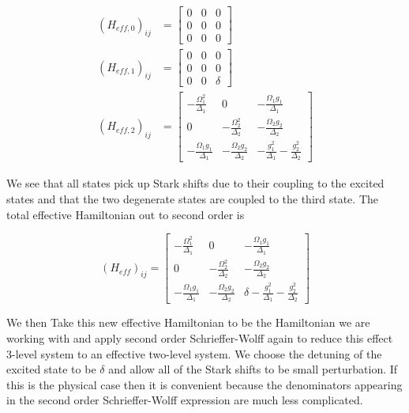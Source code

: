 \documentclass[12pt]{article}
\begin{document}
\begin{equation}
\begin{split}
(H_{eff,0})_{ij} & = \begin{bmatrix}
0 & 0 & 0\\ 0 & 0 & 0\\ 0 & 0 & 0
\end{bmatrix}\\
(H_{eff,1})_{ij} & = \begin{bmatrix}
0 & 0 & 0\\ 0 & 0 & 0\\0 & 0 & \delta
\end{bmatrix}\\
(H_{eff,2})_{ij} & = \begin{bmatrix}
-\frac{\Omega_1^2}{\Delta_1} & 0 & -\frac{\Omega_1g_1}{\Delta_1}\\
0 & -\frac{\Omega_2^2}{\Delta_2} & -\frac{\Omega_2g_2}{\Delta_2}\\
-\frac{\Omega_1g_1}{\Delta_1} & -\frac{\Omega_2g_2}{\Delta_2} & - \frac{g_1^2}{\Delta_1} - \frac{g_2^2}{\Delta_2}
\end{bmatrix}
\end{split}
\end{equation}

We see that all states pick up Stark shifts due to their coupling to the excited states and that the two degenerate states are coupled to the third state. The total effective Hamiltonian out to second order is

\begin{equation}
(H_{eff})_{ij} = \begin{bmatrix}
-\frac{\Omega_1^2}{\Delta_1} & 0 & -\frac{\Omega_1g_1}{\Delta_1}\\
0 & -\frac{\Omega_2^2}{\Delta_2} & -\frac{\Omega_2g_2}{\Delta_2}\\
-\frac{\Omega_1g_1}{\Delta_1} & -\frac{\Omega_2g_2}{\Delta_2} & \delta - \frac{g_1^2}{\Delta_1} - \frac{g_2^2}{\Delta_2}
\end{bmatrix}
\end{equation}

We then Take this new effective Hamiltonian to be the Hamiltonian we are working with and apply second order Schrieffer-Wolff again to reduce this effect 3-level system to an effective two-level system. We choose the detuning of the excited state to be $\delta$ and allow all of the Stark shifts to be small perturbation. If this is the physical case then it is convenient because the denominators appearing in the second order Schrieffer-Wolff expression are much less complicated.
\end{document}
